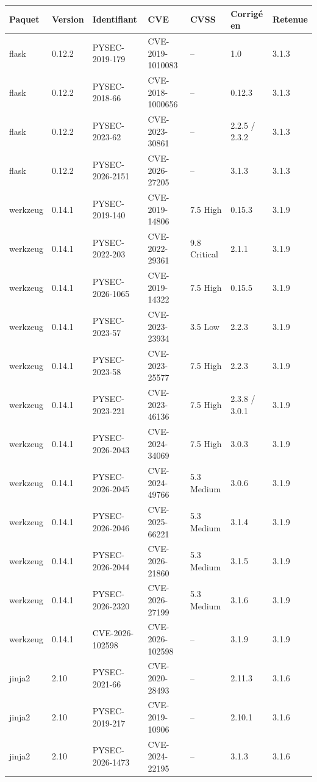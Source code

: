 \documentclass[11pt,a4paper]{article}
\begin{document}
{\footnotesize\setlength{\tabcolsep}{4pt}
\begin{longtable}{@{}lllllll@{}}
\toprule
\textbf{Paquet} & \textbf{Version} & \textbf{Identifiant} & \textbf{CVE} & \textbf{CVSS} & \textbf{Corrigé en} & \textbf{Retenue} \\
\midrule
\endhead
flask & 0.12.2 & PYSEC-2019-179 & CVE-2019-1010083 & -- & 1.0 & 3.1.3 \\
flask & 0.12.2 & PYSEC-2018-66 & CVE-2018-1000656 & -- & 0.12.3 & 3.1.3 \\
flask & 0.12.2 & PYSEC-2023-62 & CVE-2023-30861 & -- & 2.2.5 / 2.3.2 & 3.1.3 \\
flask & 0.12.2 & PYSEC-2026-2151 & CVE-2026-27205 & -- & 3.1.3 & 3.1.3 \\
werkzeug & 0.14.1 & PYSEC-2019-140 & CVE-2019-14806 & 7.5 High & 0.15.3 & 3.1.9 \\
werkzeug & 0.14.1 & PYSEC-2022-203 & CVE-2022-29361 & 9.8 Critical & 2.1.1 & 3.1.9 \\
werkzeug & 0.14.1 & PYSEC-2026-1065 & CVE-2019-14322 & 7.5 High & 0.15.5 & 3.1.9 \\
werkzeug & 0.14.1 & PYSEC-2023-57 & CVE-2023-23934 & 3.5 Low & 2.2.3 & 3.1.9 \\
werkzeug & 0.14.1 & PYSEC-2023-58 & CVE-2023-25577 & 7.5 High & 2.2.3 & 3.1.9 \\
werkzeug & 0.14.1 & PYSEC-2023-221 & CVE-2023-46136 & 7.5 High & 2.3.8 / 3.0.1 & 3.1.9 \\
werkzeug & 0.14.1 & PYSEC-2026-2043 & CVE-2024-34069 & 7.5 High & 3.0.3 & 3.1.9 \\
werkzeug & 0.14.1 & PYSEC-2026-2045 & CVE-2024-49766 & 5.3 Medium & 3.0.6 & 3.1.9 \\
werkzeug & 0.14.1 & PYSEC-2026-2046 & CVE-2025-66221 & 5.3 Medium & 3.1.4 & 3.1.9 \\
werkzeug & 0.14.1 & PYSEC-2026-2044 & CVE-2026-21860 & 5.3 Medium & 3.1.5 & 3.1.9 \\
werkzeug & 0.14.1 & PYSEC-2026-2320 & CVE-2026-27199 & 5.3 Medium & 3.1.6 & 3.1.9 \\
werkzeug & 0.14.1 & CVE-2026-102598 & CVE-2026-102598 & -- & 3.1.9 & 3.1.9 \\
jinja2 & 2.10 & PYSEC-2021-66 & CVE-2020-28493 & -- & 2.11.3 & 3.1.6 \\
jinja2 & 2.10 & PYSEC-2019-217 & CVE-2019-10906 & -- & 2.10.1 & 3.1.6 \\
jinja2 & 2.10 & PYSEC-2026-1473 & CVE-2024-22195 & -- & 3.1.3 & 3.1.6 \\

\end{longtable}}
\end{document}
